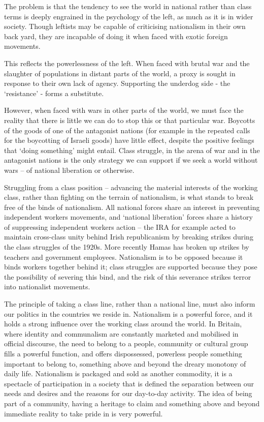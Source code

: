 The problem is that the tendency to see the world in national rather than class terms is deeply engrained in the psychology of the left, as much as it is in wider society.
Though leftists may be capable of criticising nationalism in their own back yard, they are incapable of doing it when faced with exotic foreign movements.

This reflects the powerlessness of the left.
When faced with brutal war and the slaughter of populations in distant parts of the world, a proxy is sought in response to their own lack of agency.
Supporting the underdog side - the ‘resistance’ - forms a substitute.

However, when faced with wars in other parts of the world, we must face the reality that there is little we can do to stop this or that particular war.
Boycotts of the goods of one of the antagonist nations (for example in the repeated calls for the boycotting of Israeli goods) have little effect, despite the positive feelings that ‘doing something’ might entail.
Class struggle, in the arena of war and in the antagonist nations is the only strategy we can support if we seek a world without wars – of national liberation or otherwise.

Struggling from a class position – advancing the material interests of the working class, rather than fighting on the terrain of nationalism, is what stands to break free of the binds of nationalism.
All national forces share an interest in preventing independent workers movements, and ‘national liberation’ forces share a history of suppressing independent workers action – the IRA for example acted to maintain cross-class unity behind Irish republicanism by breaking strikes during the class struggles of the 1920s.
More recently Hamas has broken up strikes by teachers and government employees.
Nationalism is to be opposed because it binds workers together behind it; class struggles are supported because they pose the possibility of severing this bind, and the risk of this severance strikes terror into nationalist movements.

The principle of taking a class line, rather than a national line, must also inform our politics in the countries we reside in.
Nationalism is a powerful force, and it holds a strong influence over the working class around the world.
In Britain, where identity and communalism are constantly marketed and mobilised in official discourse, the need to belong to a people, community or cultural group fills a powerful function, and offers dispossessed, powerless people something important to belong to, something above and beyond the dreary monotony of daily life.
Nationalism is packaged and sold as another commodity, it is a spectacle of participation in a society that is defined the separation between our needs and desires and the reasons for our day-to-day activity.
The idea of being part of a community, having a heritage to claim and something above and beyond immediate reality to take pride in is very powerful.

